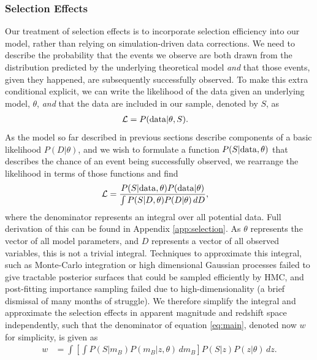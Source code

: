\documentclass[a4paper,fleqn,usenatbib]{mnras}
\begin{document}
\subsubsection{Selection Effects}
\label{sec:selection}
Our treatment of selection effects is to incorporate selection efficiency into our model, rather than relying on simulation-driven data corrections. We need to describe the probability that the events we observe are both drawn from the distribution predicted by the underlying theoretical model \textit{and} that those events, given they happened, are subsequently successfully observed.  To make this extra conditional explicit, we can write the likelihood of the data given an underlying model, $\theta$, \textit{and} that the data are included in our sample, denoted by $S$, as
\begin{align}
\mathcal{L} &= P({\rm data} | \theta, S). \label{eq:like}
\end{align}
As the model so far described in previous sections describe components of a basic likelihood $P(D|\theta)$, and we wish to formulate a function $P(S|{\rm data},\theta)$ that describes the chance of an event being successfully observed, we rearrange the likelihood in terms of those functions and find
\begin{align}
\mathcal{L} &= \frac{P(S|{\rm data},\theta) P({\rm data}|\theta)}{\int P(S | D, \theta) P(D|\theta)\, dD}, \label{eq:main}
\end{align}
where the denominator represents an integral over all potential data. Full derivation of this can be found in Appendix \ref{app:selection}. As $\theta$ represents the vector of all model parameters, and $D$ represents a vector of all observed variables, this is not a trivial integral. Techniques to approximate this integral, such as Monte-Carlo integration or high dimensional Gaussian processes failed to give tractable posterior surfaces that could be sampled efficiently by HMC, and post-fitting importance sampling failed due to high-dimensionality (a brief dismissal of many months of struggle). We therefore simplify the integral and approximate the selection effects in apparent magnitude and redshift space independently, such that the denominator of equation \eqref{eq:main}, denoted now $w$ for simplicity, is given as
\begin{align}
w &= \int  \left[ \int P(S|m_B) P(m_B | z, \theta)\, d m_B \right] P(S|z) P(z|\theta)\, dz. \label{eq:w1}
\end{align}
\end{document}
